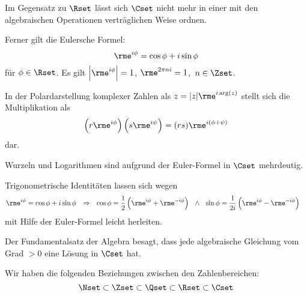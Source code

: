 \documentclass[a4paper,10pt]{article}
\begin{document}
Im Gegensatz zu $\Rset$ lässt sich $\Cset$ nicht mehr in einer mit
den algebraischen Operationen verträglichen Weise ordnen.
\pagebreak

Ferner gilt die Eulersche Formel:
\[
\rme^{i\phi} = \cos\phi+i\sin\phi
\]
für $\phi\in\Rset$. Es gilt $\left|\rme^{i\phi}\right|=1$, $\rme^{2\pi ni}=1$,~$n\in\Zset$. 

In der Polardarstellung komplexer Zahlen als $z=|z|\rme^{i\arg(z)}$ stellt sich
die Multiplikation als
\[
\left(r\rme^{i\phi}\right)\left(s\rme^{i\psi}\right) = (rs)\rme^{i(\phi+\psi)}
\]
dar.

Wurzeln und Logarithmen sind aufgrund der Euler-Formel in $\Cset$ mehrdeutig.

Trigonometrische Identitäten lassen sich wegen
\begin{align*}
\rme^{i\phi}&=\cos\phi+i\sin\phi&\Rightarrow~~
\cos\phi&=\frac{1}{2}\left(\rme^{i\phi}+\rme^{-i\phi}\right)~~\wedge~~
\sin\phi=\frac{1}{2i}\left(\rme^{i\phi}-\rme^{-i\phi}\right)
\end{align*}
mit Hilfe der Euler-Formel leicht herleiten.

Der Fundamentalsatz der Algebra besagt, dass jede algebraische Gleichung vom Grad $>0$ eine Lösung in $\Cset$ hat.

Wir haben die folgenden Beziehungen zwischen den Zahlenbereichen:
\[
\Nset\subset\Zset\subset\Qset\subset\Rset\subset\Cset
\]
\end{document}

